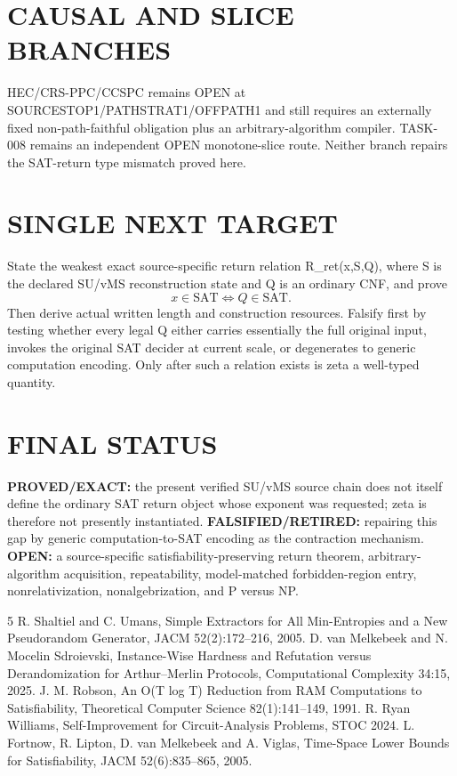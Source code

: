 \documentclass[11pt]{article}
\begin{document}
\section*{CAUSAL AND SLICE BRANCHES}
HEC/CRS-PPC/CCSPC remains OPEN at SOURCESTOP1/PATHSTRAT1/OFFPATH1 and still requires an externally fixed non-path-faithful obligation plus an arbitrary-algorithm compiler. TASK-008 remains an independent OPEN monotone-slice route. Neither branch repairs the SAT-return type mismatch proved here.

\section*{SINGLE NEXT TARGET}
State the weakest exact source-specific return relation R_ret(x,S,Q), where S is the declared SU/vMS reconstruction state and Q is an ordinary CNF, and prove
\[
x\in\mathrm{SAT}\iff Q\in\mathrm{SAT}.
\]
Then derive actual written length and construction resources. Falsify first by testing whether every legal Q either carries essentially the full original input, invokes the original SAT decider at current scale, or degenerates to generic computation encoding. Only after such a relation exists is zeta a well-typed quantity.

\section*{FINAL STATUS}
\textbf{PROVED/EXACT:} the present verified SU/vMS source chain does not itself define the ordinary SAT return object whose exponent was requested; zeta is therefore not presently instantiated. \textbf{FALSIFIED/RETIRED:} repairing this gap by generic computation-to-SAT encoding as the contraction mechanism. \textbf{OPEN:} a source-specific satisfiability-preserving return theorem, arbitrary-algorithm acquisition, repeatability, model-matched forbidden-region entry, nonrelativization, nonalgebrization, and P versus NP.

\begin{thebibliography}{5}
 R. Shaltiel and C. Umans, Simple Extractors for All Min-Entropies and a New Pseudorandom Generator, JACM 52(2):172--216, 2005.
 D. van Melkebeek and N. Mocelin Sdroievski, Instance-Wise Hardness and Refutation versus Derandomization for Arthur--Merlin Protocols, Computational Complexity 34:15, 2025.
 J. M. Robson, An O(T log T) Reduction from RAM Computations to Satisfiability, Theoretical Computer Science 82(1):141--149, 1991.
 R. Ryan Williams, Self-Improvement for Circuit-Analysis Problems, STOC 2024.
 L. Fortnow, R. Lipton, D. van Melkebeek and A. Viglas, Time-Space Lower Bounds for Satisfiability, JACM 52(6):835--865, 2005.
\end{thebibliography}
\end{document}
